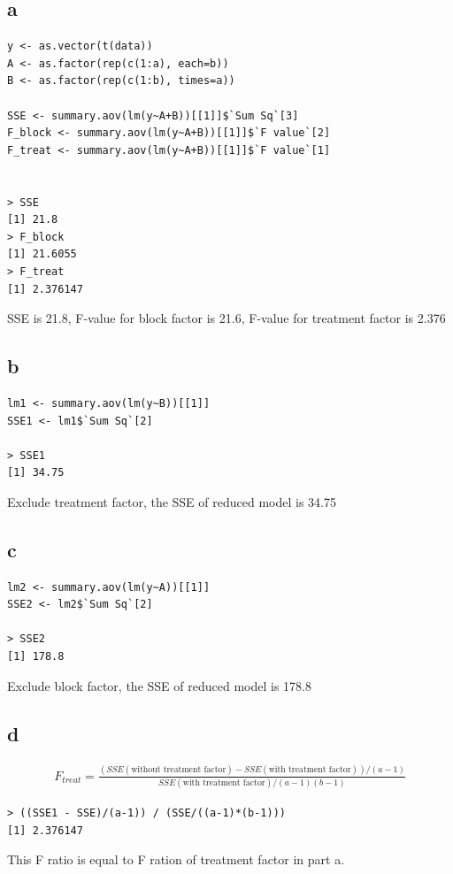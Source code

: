 \documentclass[11pt,letterpaper]{article}
\begin{document}
\subsection*{a}
\begin{verbatim}
y <- as.vector(t(data))
A <- as.factor(rep(c(1:a), each=b))
B <- as.factor(rep(c(1:b), times=a))

SSE <- summary.aov(lm(y~A+B))[[1]]$`Sum Sq`[3]
F_block <- summary.aov(lm(y~A+B))[[1]]$`F value`[2]
F_treat <- summary.aov(lm(y~A+B))[[1]]$`F value`[1]


> SSE
[1] 21.8
> F_block
[1] 21.6055
> F_treat
[1] 2.376147
\end{verbatim}
\noindent SSE is 21.8, F-value for block factor is 21.6, F-value for treatment factor is 2.376

\subsection*{b}
\begin{verbatim}
lm1 <- summary.aov(lm(y~B))[[1]]
SSE1 <- lm1$`Sum Sq`[2]

> SSE1
[1] 34.75
\end{verbatim}
\noindent Exclude treatment factor, the SSE of reduced model is 34.75

\subsection*{c}
\begin{verbatim}
lm2 <- summary.aov(lm(y~A))[[1]]
SSE2 <- lm2$`Sum Sq`[2]

> SSE2
[1] 178.8
\end{verbatim}

\noindent Exclude block factor, the SSE of reduced model is 178.8

\subsection*{d}
\begin{align*}
F_{treat} = \frac{(SSE(\text{without treatment factor}) - SSE(\text{with treatment factor}) )  / (a - 1)}{SSE(\text{with treatment factor})  / (a - 1)(b - 1)}
\end{align*}
\begin{verbatim}
> ((SSE1 - SSE)/(a-1)) / (SSE/((a-1)*(b-1)))
[1] 2.376147
\end{verbatim}
\noindent This F ratio is equal to F ration of treatment factor in part a.
\end{document}
